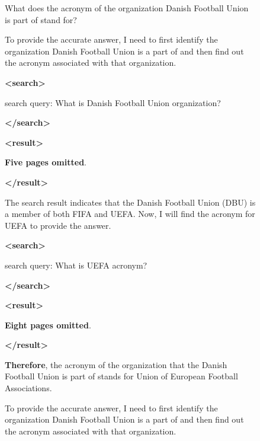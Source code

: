 \documentclass{llmxive}
\begin{document}
\begin{figure}[h]
\centering
 
\begin{tcolorbox}[
    colback=gray!5!white, 
    colframe=brown!75!brown, 
    title=Case-2 from Musique, 
    boxrule=0.3mm, 
    width=\linewidth,  
    arc=2mm, 
    auto outer arc=true
]
What does the acronym of the organization Danish Football Union is part of stand for?
\end{tcolorbox}

\vspace{0.2cm}   

\begin{minipage}[t]{0.48\linewidth}  
    \begin{tcolorbox}[
        colback=gray!5!white, 
        colframe=red!75!brown, 
        title=Wrong Rollout, 
        boxrule=0.3mm, 
        width=\linewidth, 
        arc=2mm, 
        height=18cm,
        auto outer arc=true,
        top=2mm, bottom=2mm, left=2mm, right=2mm  
    ]
    To provide the accurate answer, I need to first identify the organization  Danish Football Union is a part of and then find out the acronym associated 
    with that organization.

    \textbf{<search>}
    
    search query: What is Danish Football Union organization?
    
    \textbf{</search>}
    
    \textbf{<result>}
    
    \textbf{Five pages omitted}.

    \textbf{</result>}

    The search result indicates that the Danish Football Union (DBU) is a member 
    of both FIFA and UEFA. Now, I will find the acronym for UEFA to provide the answer.

    \textbf{<search>}
    
    search query: What is UEFA acronym?
    
    \textbf{</search>}
    
    \textbf{<result>}
    
    \textbf{Eight pages omitted}.

    \textbf{</result>}

    \textbf{Therefore}, the acronym of the organization that the Danish Football Union is 
    part of stands for Union of European Football Associations.
    \end{tcolorbox}
\end{minipage} 
\hfill 
\begin{minipage}[t]{0.48\linewidth} 
    \begin{tcolorbox}[
        colback=gray!5!white, 
        colframe=blue!75!brown, 
        title=APPO Branching, 
        boxrule=0.3mm, 
        width=\linewidth,  
        arc=2mm, 
        height=18cm,
        auto outer arc=true,
        top=2mm, bottom=2mm, left=2mm, right=2mm 
    ]
    To provide the accurate answer, I need to first identify the organization 
    Danish Football Union is a part of and then find out the acronym associated 
    with that organization.


\end{tcolorbox}
\end{minipage}
\end{figure}
\end{document}
